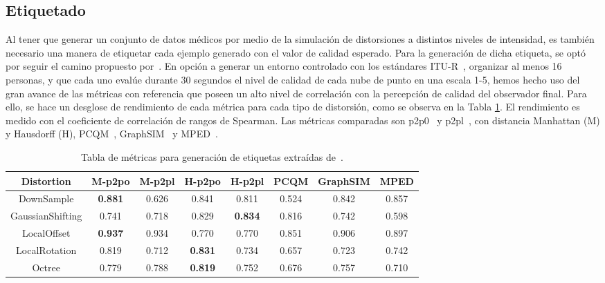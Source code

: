 \subsection{Etiquetado}
Al tener que generar un conjunto de datos médicos por medio de la simulación 
de distorsiones a distintos niveles de intensidad, es también necesario una manera 
de etiquetar cada ejemplo generado con el valor de calidad esperado. 
Para la generación de dicha etiqueta, se optó por seguir el camino propuesto por~\cite{ResSCNN}. 
En opción a generar un entorno controlado con los estándares ITU-R~\cite{ITU-R.2012, ITU-R.2021}, 
organizar al menos 16 personas, y que cada uno evalúe durante 30 segundos el nivel 
de calidad de cada nube de punto en una escala 1-5, hemos hecho uso del gran 
avance de las métricas con referencia que poseen un alto nivel de correlación con 
la percepción de calidad del observador final. 
Para ello, se hace un desglose de rendimiento de cada métrica para cada tipo 
de distorsión, como se observa en la Tabla \ref{tab:MetricsPerDistortion}. El 
rendimiento es medido con el coeficiente de correlación de rangos de Spearman.
Las métricas comparadas son p2p0~\cite{PointToPoint} y p2pl~\cite{PointToPlane}, 
con distancia Manhattan (M) y Hausdorff (H), PCQM~\cite{PCQM}, GraphSIM~\cite{GraphSIM} y 
MPED~\cite{MPED}.

\begin{table}[htp]
    \scriptsize
    \hspace{-.7cm}
    \begin{tabular}{|c|c|c|c|c|c|c|c|}
    \hline
        \rowcolor[HTML]{FFC702} 
        \textbf{Distortion} & \textbf{M-p2po} & \textbf{M-p2pl} & \textbf{H-p2po} & \textbf{H-p2pl} & \textbf{PCQM} & \textbf{GraphSIM} & \textbf{MPED} \\ \hline
        DownSample & \textbf{0.881} & 0.626 & 0.841 & 0.811 & 0.524 & 0.842 & 0.857 \\ \hline
        GaussianShifting & 0.741 & 0.718 & 0.829 & \textbf{0.834} & 0.816 & 0.742 & 0.598 \\ \hline
        LocalOffset & \textbf{0.937} & 0.934 & 0.770 & 0.770 & 0.851 & 0.906 & 0.897 \\ \hline
        LocalRotation & 0.819 & 0.712 & \textbf{0.831} & 0.734 & 0.657 & 0.723 & 0.742 \\ \hline
        Octree & 0.779 & 0.788 & \textbf{0.819} & 0.752 & 0.676 & 0.757 & 0.710 \\ \hline
    \end{tabular}
    \caption[Tabla de métricas para generación de etiquetas.]{
      Tabla de métricas para generación de etiquetas extraídas de~\cite{ResSCNN}.
  }
    \label{tab:MetricsPerDistortion}
\end{table}

